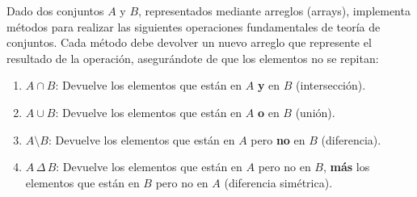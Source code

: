 Dado dos conjuntos \( A \) y \( B \), representados mediante arreglos (arrays), implementa métodos para realizar las siguientes operaciones fundamentales de teoría de conjuntos. Cada método debe devolver un nuevo arreglo que represente el resultado de la operación, asegurándote de que los elementos no se repitan:
    
\begin{enumerate}
    \item \( A \cap B \): Devuelve los elementos que están en \( A \) \textbf{y} en \( B \) (intersección).
    \item \( A \cup B \): Devuelve los elementos que están en \( A \) \textbf{o} en \( B \) (unión).
    \item \( A \setminus B \): Devuelve los elementos que están en \( A \) pero \textbf{no} en \( B \) (diferencia).
    \item \( A \, \Delta \, B \): Devuelve los elementos que están en \( A \) pero no en \( B \), \textbf{más} los elementos que están en \( B \) pero no en \( A \) (diferencia simétrica).
\end{enumerate}

